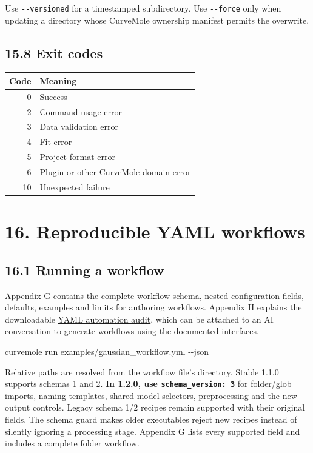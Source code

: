 \documentclass[
  10pt,
  a4paper,
  oneside]{scrreprt}
\newenvironment{Shaded}{}{}
\newcommand{\ExtensionTok}[1]{#1}
\newcommand{\NormalTok}[1]{#1}
\begin{document}
Use \texttt{-\/-versioned} for a timestamped subdirectory. Use
\texttt{-\/-force} only when updating a directory whose CurveMole
ownership manifest permits the overwrite.

\hypertarget{exit-codes}{%
\section{15.8 Exit codes}\label{exit-codes}}

\begin{longtable}[]{@{}rl@{}}
\toprule
Code & Meaning\tabularnewline
\midrule
\endhead
0 & Success\tabularnewline
2 & Command usage error\tabularnewline
3 & Data validation error\tabularnewline
4 & Fit error\tabularnewline
5 & Project format error\tabularnewline
6 & Plugin or other CurveMole domain error\tabularnewline
10 & Unexpected failure\tabularnewline
\bottomrule
\end{longtable}

\hypertarget{reproducible-yaml-workflows}{%
\chapter{16. Reproducible YAML
workflows}\label{reproducible-yaml-workflows}}

\hypertarget{running-a-workflow}{%
\section{16.1 Running a workflow}\label{running-a-workflow}}

Appendix G contains the complete workflow schema, nested configuration
fields, defaults, examples and limits for authoring workflows. Appendix
H explains the downloadable \href{ai-yaml-audit.md}{YAML automation
audit}, which can be attached to an AI conversation to generate
workflows using the documented interfaces.

\begin{Shaded}
\begin{Highlighting}[]
\ExtensionTok{curvemole}\NormalTok{ run examples/gaussian\_workflow.yml {-}{-}json}
\end{Highlighting}
\end{Shaded}

Relative paths are resolved from the workflow file's directory. Stable
1.1.0 supports schemas 1 and 2. \textbf{In 1.2.0, use
\texttt{schema\_version:\ 3}} for folder/glob imports, naming templates,
shared model selectors, preprocessing and the new output controls.
Legacy schema 1/2 recipes remain supported with their original fields.
The schema guard makes older executables reject new recipes instead of
silently ignoring a processing stage. Appendix G lists every supported
field and includes a complete folder workflow.
\end{document}
